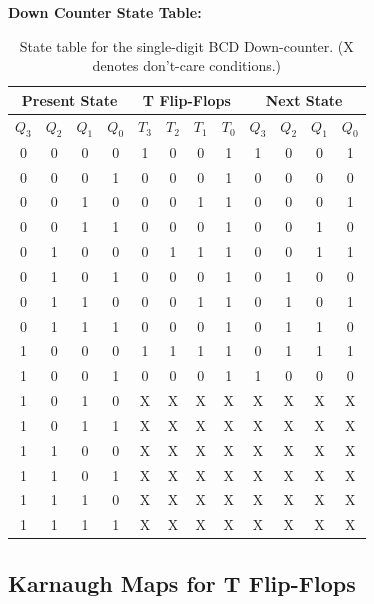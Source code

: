 \documentclass[12pt]{article}
\begin{document}
\vspace{0.5cm}
\textbf{Down Counter State Table:}
\begin{table}[H]
\centering
\begin{tabular}{|c|c|c|c||c|c|c|c||c|c|c|c|}
\hline
\multicolumn{4}{|c||}{Present State} & \multicolumn{4}{c||}{T Flip-Flops} & \multicolumn{4}{c|}{Next State} \\
\hline
\(Q_3\) & \(Q_2\) & \(Q_1\) & \(Q_0\) & \(T_3\) & \(T_2\) & \(T_1\) & \(T_0\) & \(Q_3\) & \(Q_2\) & \(Q_1\) & \(Q_0\) \\
\hline
0 & 0 & 0 & 0 & 1 & 0 & 0 & 1 & 1 & 0 & 0 & 1 \\
\hline
0 & 0 & 0 & 1 & 0 & 0 & 0 & 1 & 0 & 0 & 0 & 0 \\
\hline
0 & 0 & 1 & 0 & 0 & 0 & 1 & 1 & 0 & 0 & 0 & 1 \\
\hline
0 & 0 & 1 & 1 & 0 & 0 & 0 & 1 & 0 & 0 & 1 & 0 \\
\hline
0 & 1 & 0 & 0 & 0 & 1 & 1 & 1 & 0 & 0 & 1 & 1 \\
\hline
0 & 1 & 0 & 1 & 0 & 0 & 0 & 1 & 0 & 1 & 0 & 0 \\
\hline
0 & 1 & 1 & 0 & 0 & 0 & 1 & 1 & 0 & 1 & 0 & 1 \\
\hline
0 & 1 & 1 & 1 & 0 & 0 & 0 & 1 & 0 & 1 & 1 & 0 \\
\hline
1 & 0 & 0 & 0 & 1 & 1 & 1 & 1 & 0 & 1 & 1 & 1 \\
\hline
1 & 0 & 0 & 1 & 0 & 0 & 0 & 1 & 1 & 0 & 0 & 0 \\
\hline
1 & 0 & 1 & 0 & X & X & X & X & X & X & X & X \\
\hline
1 & 0 & 1 & 1 & X & X & X & X & X & X & X & X \\
\hline
1 & 1 & 0 & 0 & X & X & X & X & X & X & X & X \\
\hline
1 & 1 & 0 & 1 & X & X & X & X & X & X & X & X \\
\hline
1 & 1 & 1 & 0 & X & X & X & X & X & X & X & X \\
\hline
1 & 1 & 1 & 1 & X & X & X & X & X & X & X & X \\
\hline
\end{tabular}
\caption{State table for the single-digit BCD Down-counter. (X denotes don't-care conditions.)}
\end{table}

\newpage
\subsection*{Karnaugh Maps for T Flip-Flops}
\end{document}
